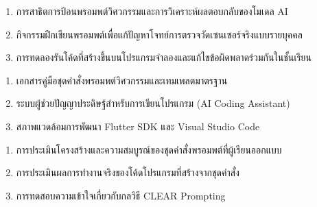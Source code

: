\begin{tcolorbox}[
    enhanced, breakable,
    colback=white, colframe=rbruNavy,
    fonttitle=\bfseries\color{white},
    title={3. วิธีสอนและกิจกรรมการเรียนการสอน},
    arc=1.5mm, boxrule=0.8pt, leftrule=3.5mm
]
\begin{enumerate}
    \item การสาธิตการป้อนพรอมพต์วิศวกรรมและการวิเคราะห์ผลตอบกลับของโมเดล AI
    \item กิจกรรมฝึกเขียนพรอมพต์เพื่อแก้ปัญหาโจทย์การตรวจวัดเซนเซอร์จริงแบบรายบุคคล
    \item การทดลองรันโค้ดที่สร้างขึ้นบนโปรแกรมจำลองและแก้ไขข้อผิดพลาดร่วมกันในชั้นเรียน
\end{enumerate}
\end{tcolorbox}

\begin{tcolorbox}[
    enhanced, breakable,
    colback=white, colframe=rbruNavy,
    fonttitle=\bfseries\color{white},
    title={4. สื่อการเรียนการสอน},
    arc=1.5mm, boxrule=0.8pt, leftrule=3.5mm
]
\begin{enumerate}
    \item เอกสารคู่มือชุดคำสั่งพรอมพต์วิศวกรรมและเทมเพลตมาตรฐาน
    \item ระบบผู้ช่วยปัญญาประดิษฐ์สำหรับการเขียนโปรแกรม (AI Coding Assistant)
    \item สภาพแวดล้อมการพัฒนา Flutter SDK และ Visual Studio Code
\end{enumerate}
\end{tcolorbox}

\begin{tcolorbox}[
    enhanced, breakable,
    colback=white, colframe=rbruNavy,
    fonttitle=\bfseries\color{white},
    title={5. การวัดและประเมินผล},
    arc=1.5mm, boxrule=0.8pt, leftrule=3.5mm
]
\begin{enumerate}
    \item การประเมินโครงสร้างและความสมบูรณ์ของชุดคำสั่งพรอมพต์ที่ผู้เรียนออกแบบ
    \item การประเมินผลการทำงานจริงของโค้ดโปรแกรมที่สร้างจากชุดคำสั่ง
    \item การทดสอบความเข้าใจเกี่ยวกับกลวิธี CLEAR Prompting
\end{enumerate}
\end{tcolorbox}

\clearpage

